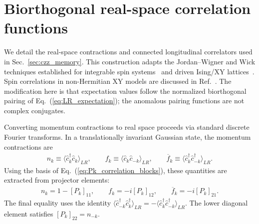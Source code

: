 \documentclass[aps,prb,reprint,superscriptaddress,amsmath,amssymb,floatfix]{revtex4-2}
\begin{document}
\section{Biorthogonal real-space correlation functions}
\label{app:biorthogonal_correlations}

We detail the real-space contractions and connected longitudinal correlators used in Sec.~\ref{sec:czz_memory}. This construction adapts the Jordan--Wigner and Wick techniques established for integrable spin systems~\cite{LiebSchultzMattis1961,BarouchMcCoy1971} and driven Ising/XY lattices~\cite{CherngLevitov2006,Cincio2007,SenguptaSen2009,JafariPRR2025,NajiPRB2025}. Spin correlations in non-Hermitian XY models are discussed in Ref.~\cite{Miao2024}. The modification here is that expectation values follow the normalized biorthogonal pairing of Eq.~(\ref{eq:LR_expectation}); the anomalous pairing functions are not complex conjugates.

  Converting momentum contractions to real space proceeds via standard discrete Fourier transforms. In a translationally invariant Gaussian state, the momentum contractions are
\begin{equation}
\begin{aligned}
n_k \!\equiv\! \langle \hat c_k^\dagger\hat c_k\rangle_{LR}, \qquad f_k \!\equiv\! \langle \hat c_k\hat c_{-k}\rangle_{LR}, \qquad \overline f_k \!\equiv\! \langle \hat c_k^\dagger\hat c_{-k}^\dagger\rangle_{LR}.
\end{aligned} \label{eq:app_momentum_contractions}
\end{equation}
Using the basis of Eq.~(\ref{eq:Pk_correlation_blocks}), these quantities are extracted from projector elements:
\begin{equation}
\begin{aligned}
n_k = 1-\left[P_k\right]_{11}, \qquad f_k = -i\left[P_k\right]_{12}, \qquad \overline f_k = -i\left[P_k\right]_{21}.
\end{aligned} \label{eq:app_projector_components}
\end{equation}
The final equality uses the identity $\langle \hat c_{-k}^\dagger\hat c_k^\dagger\rangle_{LR}
=-\langle \hat c_k^\dagger\hat c_{-k}^\dagger\rangle_{LR}$. The lower diagonal element satisfies $[P_k]_{22}=n_{-k}$.
\end{document}
